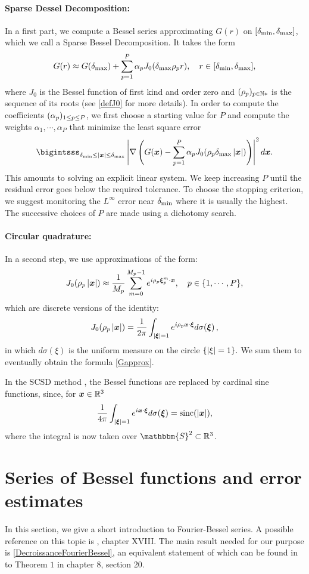 \documentclass[smallextended]{svjour3}
\begin{document}
\paragraph{Sparse Dessel Decomposition:} In a first part, we compute a Bessel series approximating $G(r)$ on $[\delta_{\min},\delta_{\max}]$, which we call a Sparse Bessel Decomposition. It takes the form
\[G(r) \approx G(\delta_{\max}) + \sum_{p=1}^P \alpha_p J_0(\delta_{\max} \rho_p r), \quad r \in [\delta_{\min},\delta_{\max}],\]
where $J_0$ is the Bessel function of first kind and order zero and $(\rho_p)_{p \in \mathbb{N}*}$ is the sequence of its roots (see \autoref{defJ0} for more details). In order to compute the coefficients $(\alpha_{p})_{1 \leq p \leq P}$, we first choose a starting value for $P$ and compute the weights $\alpha_1,\cdots, \alpha_{P}$ that minimize the least square error
\[\bigintsss_{\rmin \leq |\bs{x}|\leq \rmax} \abs{\nabla \left(G(\bs{x}) - \sum_{p=1}^P \alpha_p J_0(\rho_p \rmax \abs{\bs{x}})\right)}^2 d\bs{x}.\]
This amounts to solving an explicit linear system. We keep increasing $P$ until the residual error goes below the required tolerance. To choose the stopping criterion, we suggest monitoring the $L^{\infty}$ error near $\delta_{\min}$ where it is usually the highest. The successive choices of $P$ are made using a dichotomy search. 
\paragraph{Circular quadrature:}In a second step, we use approximations of the form:
\[J_0(\rho_p \left\lvert \boldsymbol{x} \right\rvert) \approx \dfrac{1}{M_p}\sum_{m=0}^{M_p-1}e^{i \rho_p \boldsymbol{\xi}_p^m \cdot \boldsymbol{x}}, \quad p \in \{1,\cdots,P\},\]
which are discrete versions of the identity:
\[ J_0(\rho_p\left\lvert \boldsymbol{x} \right\rvert) = \frac{1}{2\pi}\int_{\left\lvert \boldsymbol{\xi} \right\rvert=1}{e^{i \rho_p\boldsymbol{x} \cdot \boldsymbol{\xi}}} d\sigma(\boldsymbol{\xi})\,,\]
in which $d\sigma(\xi)$ is the uniform measure on the circle $\{\left\lvert \xi \right\rvert = 1\}. $
We sum them to eventually obtain the formula \eqref{Gapprox}. 
\begin{remark}
	In the SCSD method \cite{Alouges2015}, the Bessel functions are replaced by cardinal sine functions, since, for $\boldsymbol{x} \in \mathbb{R}^3$
	\[ \frac{1}{4\pi}\int_{\left\lvert \boldsymbol{\xi} \right\rvert=1} e^{i \boldsymbol{x}\cdot \boldsymbol{\xi}} d\sigma(\boldsymbol{\xi}) = \textup{sinc}(\left\lvert \boldsymbol{x} \right\rvert),\]
	where the integral is now taken over $\mathbbm{S}^2 \subset \R^3$.
\end{remark}



\section{Series of Bessel functions and error estimates}
\label{sec:FourierBesselSeries}
In this section, we give a short introduction to Fourier-Bessel series. A possible reference on this topic is \cite{watson1995treatise}, chapter XVIII. 
The main result needed for our purpose is \autoref{DecroissanceFourierBessel},  an equivalent statement of which can be found in to Theorem $1$ in \cite{tolstov2012fourier} chapter 8, section 20. 
\end{document}
